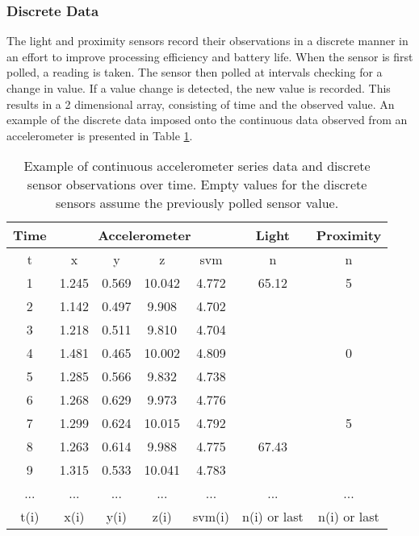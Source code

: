 \subsubsection{Discrete Data}
The light and proximity sensors record their observations in a discrete manner in an effort to improve processing efficiency and battery life. When the sensor is first polled, a reading is taken. The sensor then polled at intervals checking for a change in value. If a value change is detected, the new value is recorded. This results in a 2 dimensional array, consisting of time and the observed value. An example of the discrete data imposed onto the continuous data observed from an accelerometer is presented in Table \ref{tbl: time-series-discretel}.

\begin{table}[h]
\centering
\caption{Example of continuous accelerometer series data and discrete sensor observations over time. Empty values for the discrete sensors assume the previously polled sensor value.}
\label{tbl: time-series-discretel}
\begin{tabular}{@{}ccccccc@{}}
\toprule
Time    & \multicolumn{4}{c}{Accelerometer} & Light        & Proximity    \\ \midrule
t    & x      & y      & z      & svm    & n            & n            \\ \midrule
1    & 1.245  & 0.569  & 10.042 & 4.772  & 65.12        & 5            \\
2    & 1.142  & 0.497  & 9.908  & 4.702  &              &              \\
3    & 1.218  & 0.511  & 9.810  & 4.704  &              &              \\
4    & 1.481  & 0.465  & 10.002 & 4.809  &              & 0            \\
5    & 1.285  & 0.566  & 9.832  & 4.738  &              &              \\
6    & 1.268  & 0.629  & 9.973  & 4.776  &              &              \\
7    & 1.299  & 0.624  & 10.015 & 4.792  &              & 5            \\
8    & 1.263  & 0.614  & 9.988  & 4.775  & 67.43        &              \\
9    & 1.315  & 0.533  & 10.041 & 4.783  &              &              \\
...  & ...    & ...    & ...    & ...    & ...          & ...          \\
t(i) & x(i)   & y(i)   & z(i)   & svm(i) & n(i) or last & n(i) or last \\ \bottomrule
\end{tabular}
\end{table}

